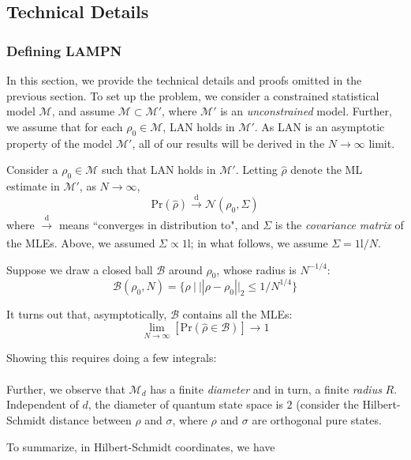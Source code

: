 \documentclass[aps,pra, twocolumn]{revtex4-1}
\newcommand{\M}{\mathcal{M}}
\newcommand{\Id}{\mathbb{I}}
\def\Id{1\!\mathrm{l}}
\begin{document}




\subsection{Technical Details}

\subsubsection{Defining LAMPN}

In this section, we provide the technical details and proofs omitted in the previous section. To set up the problem, we consider a constrained statistical model $\M$, and assume $\M \subset \M'$, where $\M'$ is an \emph{unconstrained} model. Further, we assume that for each $\rho_{0} \in \M$, LAN holds in $\M'$. As LAN is an asymptotic property of the model $\M'$, all of our results will be derived in the $N \rightarrow \infty$ limit.

Consider a $\rho_{0} \in \M$ such that LAN holds in $\M'$. Letting $\hat{\rho}$ denote the ML estimate in $\M'$, as $N \rightarrow \infty$,
\[\mathrm{Pr}(\hat{\rho})\xrightarrow[]{\text{d}} \mathcal{N}\left(\rho_{0}, \Sigma\right)\]
where $\xrightarrow[]{\text{d}}$ means ``converges in distribution to", and $\Sigma$ is the \emph{covariance matrix} of the MLEs. Above, we assumed $\Sigma \propto \Id$; in what follows, we assume $\Sigma = \Id/N$.

Suppose we draw a closed ball $\mathcal{B}$ around $\rho_{0}$, whose radius is $N^{-1/4}$:
\[\mathcal{B}(\rho_{0}, N) =\{\rho~|~||\rho - \rho_{0}||_{2} \leq 1/N^{1/4}\}\]

It turns out that, asymptotically, $\mathcal{B}$ contains all the MLEs:
 \[\lim_{N \rightarrow \infty}\left[\mathrm{Pr}\left(\hat{\rho} \in \mathcal{B}\right)\right] \rightarrow 1\]

Showing this requires doing a few integrals:
\begin{align*}
\end{align*}
 
Further, we observe that $\M_{d}$ has a finite \emph{diameter} and in turn, a finite \emph{radius} $R$. Independent of $d$, the diameter of quantum state space is $2$ (consider the Hilbert-Schmidt distance between $\rho$ and $\sigma$, where $\rho$ and $\sigma$ are orthogonal pure states.

 To summarize, in Hilbert-Schmidt coordinates, we have
 
\end{document}
